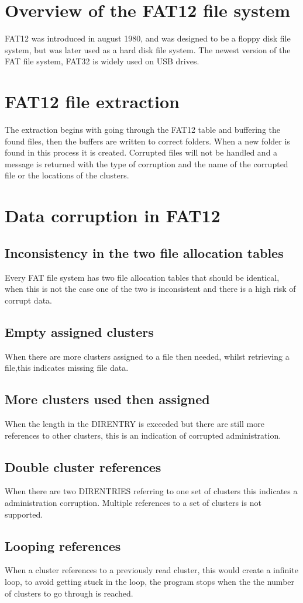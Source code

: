 \documentclass[pdftex,12pt,a4paper]{article}
\begin{document}
\section{Overview of the FAT12 file system}
FAT12 was introduced in august 1980, and was designed to be a floppy disk file system, but was later used as a hard disk file system. The newest version of the FAT file system, FAT32 is widely used on USB drives.
\section{FAT12 file extraction}
The extraction begins with going through the FAT12 table and buffering the found files, then the buffers are written to correct folders. When a new folder is found in this process it is created. Corrupted files will not be handled and a message is returned with the type of corruption and the name of the corrupted file or the locations of the clusters.
\section{Data corruption in FAT12}
\subsection{Inconsistency in the two file allocation tables}
Every FAT file system has two file allocation tables that should be identical, when this is not the case one of the two is inconsistent and there is a high risk of corrupt data.
\subsection{Empty assigned clusters}
When there are more clusters assigned to a file then needed, whilst retrieving a file,this indicates missing file data. 
\subsection{More clusters used then assigned}
When the length in the DIRENTRY is exceeded but there are still more references to other clusters, this is an indication of corrupted administration.
\subsection{Double cluster references}
When there are two DIRENTRIES referring to one set of clusters this indicates a administration corruption. Multiple references to a set of clusters is not supported.
\subsection{Looping references}
When a cluster references to a previously read cluster, this would create a infinite loop, to avoid getting stuck in the loop, the program stops when the the number of clusters to go through is reached.
\end{document}
